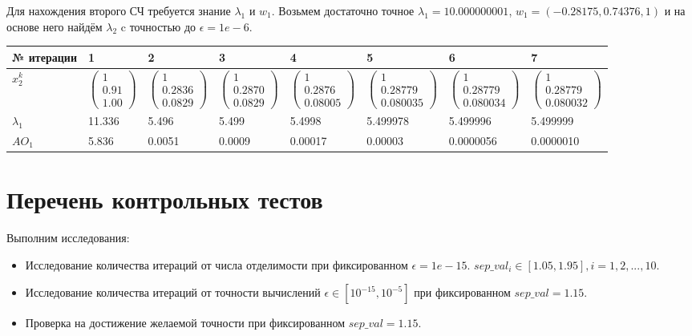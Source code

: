 \documentclass[12pt]{article}
\begin{document}
\newpage
Для нахождения второго СЧ требуется знание $\lambda_1$ и $w_1$. Возьмем достаточно точное $\lambda_1 = 10.000000001$, $w_1 = (-0.28175,0.74376, 1)$ и на основе него найдём $\lambda_2$ c точностью до $\epsilon = 1e-6$.\\
\begin{tabular}{|p{2cm}|p{1.5cm}|p{1.5cm}|p{1.5cm}|p{2cm}|p{}|p{2cm}|p{2cm}|}
\hline
   № итерации & 1 & 2 & 3 & 4 & 5 & 6 & 7\\ \hline
   $x_2^{k}$ &$\begin{pmatrix} 1\\ 0.91\\ 1.00 \end{pmatrix}$ &$\begin{pmatrix} 1\\ 0.2836\\ 0.0829 \end{pmatrix}$  &$\begin{pmatrix} 1\\ 0.2870\\ 0.0829 \end{pmatrix}$  &$\begin{pmatrix} 1\\ 0.2876\\ 0.08005\end{pmatrix}$ &$\begin{pmatrix} 1\\ 0.28779\\ 0.080035 \end{pmatrix}$ &$\begin{pmatrix} 1\\ 0.28779\\ 0.080034 \end{pmatrix}$  & $\begin{pmatrix} 1\\ 0.28779\\ 0.080032 \end{pmatrix}$ \\ \hline
   $\lambda_1$ & 11.336 &5.496 &5.499 &5.4998 &5.499978 &5.499996 & 5.499999\\\hline
   $AO_1$ & 5.836 &0.0051 &0.0009 &0.00017 &0.00003 &0.0000056&0.0000010 \\ \hline
\end{tabular}
\section{Перечень контрольных тестов}
Выполним исследования:
\begin{itemize}
    \item Исследование количества итераций от числа отделимости при фиксированном $\epsilon = 1e-15$. $sep\_val_i \in [1.05, 1.95],  i = 1,2,..., 10$.
    \item Исследование количества итераций от точности вычислений $\epsilon \in[10^{-15}, 10^{-5}]$ при фиксированном $sep\_val = 1.15$.
    \item Проверка на достижение желаемой точности при фиксированном $sep\_val = 1.15$.
\end{itemize}
\end{document}

